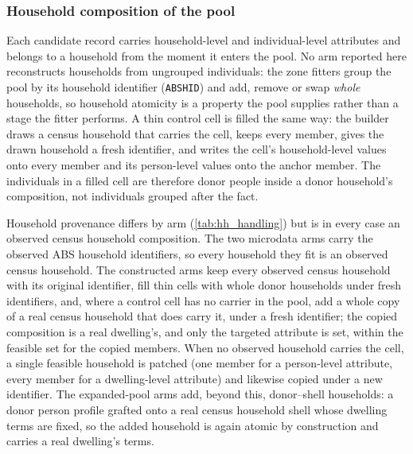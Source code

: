 \documentclass[review]{elsarticle}
\begin{document}
\subsubsection{Household composition of the pool}
\label{sec:households}
Each candidate record carries household-level and individual-level attributes
and belongs to a household from the moment it enters the pool. No arm reported
here reconstructs households from ungrouped individuals: the zone fitters group
the pool by its household identifier (\texttt{ABSHID}) and add, remove or swap
\emph{whole} households, so household atomicity is a property the pool supplies
rather than a stage the fitter performs. A thin control cell is filled the same
way: the builder draws a census household that carries the cell, keeps every
member, gives the drawn household a fresh identifier, and writes the cell's
household-level values onto every member and its person-level values onto the
anchor member. The individuals in a filled cell are therefore donor people
inside a donor household's composition, not individuals grouped after the fact.

Household provenance differs by arm (\cref{tab:hh_handling}) but is in every
case an observed census household composition. The two microdata arms carry the
observed ABS household identifiers, so every household they fit is an observed
census household. The constructed arms keep every observed census household with
its original identifier, fill thin cells with whole donor households under fresh
identifiers, and, where a control cell has no carrier in the pool,
add a whole copy of a real census household that does carry it, under a fresh
identifier; the copied composition is a real dwelling's, and only the targeted
attribute is set, within the feasible set for the copied members. When no
observed household carries the cell, a single feasible household is patched (one
member for a person-level attribute, every member for a dwelling-level attribute)
and likewise copied under a new identifier. The expanded-pool arms add, beyond
this, donor--shell households: a donor person profile grafted onto a real census
household shell whose dwelling terms are fixed, so the added household is again
atomic by construction and carries a real dwelling's terms.
\end{document}
